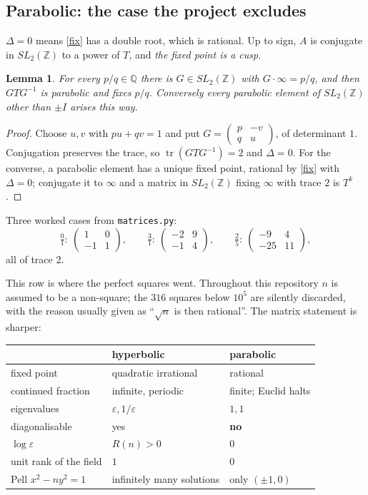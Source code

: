 \documentclass[12pt,a4paper]{article}
\theoremstyle{plain}
\newtheorem{lemma}[theorem]{Lemma}
\theoremstyle{definition}
\newcommand{\tr}{\operatorname{tr}}
\newcommand{\Mat}[4]{\begin{pmatrix} #1 & #2 \\ #3 & #4\end{pmatrix}}
\begin{document}
\subsection*{Parabolic: the case the project excludes}

$\Delta = 0$ means \eqref{fix} has a double root, which is rational. Up to sign, $A$ is conjugate in $SL_2(\mathbb{Z})$ to a power of $T$, and \emph{the fixed point is a cusp}.

\begin{lemma}
For every $p/q \in \mathbb{Q}$ there is $G \in SL_2(\mathbb{Z})$ with $G\cdot\infty = p/q$, and then $GTG^{-1}$ is parabolic and fixes $p/q$. Conversely every parabolic element of $SL_2(\mathbb{Z})$ other than $\pm I$ arises this way.
\end{lemma}

\begin{proof}
Choose $u,v$ with $pu+qv=1$ and put $G = \Mat{p}{-v}{q}{u}$, of determinant $1$. Conjugation preserves the trace, so $\tr(GTG^{-1})=2$ and $\Delta=0$. For the converse, a parabolic element has a unique fixed point, rational by \eqref{fix} with $\Delta=0$; conjugate it to $\infty$ and a matrix in $SL_2(\mathbb{Z})$ fixing $\infty$ with trace $2$ is $T^k$.
\end{proof}

Three worked cases from \texttt{matrices.py}:
\[
  \tfrac01:\ \Mat{1}{0}{-1}{1}, \qquad
  \tfrac31:\ \Mat{-2}{9}{-1}{4}, \qquad
  \tfrac{2}{5}:\ \Mat{-9}{4}{-25}{11},
\]
all of trace $2$.

This row is where the perfect squares went. Throughout this repository $n$ is assumed to be a non-square; the $316$ squares below $10^5$ are silently discarded, with the reason usually given as ``$\sqrt n$ is then rational''. The matrix statement is sharper:

\begin{center}
\begin{tabular}{lll}
\toprule
 & hyperbolic & parabolic \\
\midrule
fixed point       & quadratic irrational   & rational \\
continued fraction & infinite, periodic    & finite; Euclid halts \\
eigenvalues       & $\varepsilon, 1/\varepsilon$ & $1,1$ \\
diagonalisable    & yes                    & \textbf{no} \\
$\log\varepsilon$ & $R(n) > 0$             & $0$ \\
unit rank of the field & $1$               & $0$ \\
Pell $x^2-ny^2=1$ & infinitely many solutions & only $(\pm1,0)$ \\
\bottomrule
\end{tabular}
\end{center}
\end{document}
